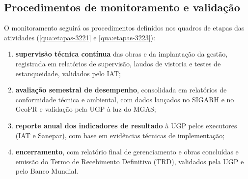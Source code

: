 \subsection{Procedimentos de monitoramento e validação}

O monitoramento seguirá os procedimentos definidos nos quadros de etapas das
atividades (\autoref{qua:etapas-3221} e \autoref{qua:etapas-3223}):

\begin{enumerate}[label=\alph*)]
  \item \textbf{supervisão técnica contínua} das obras e da implantação da
        gestão, registrada em relatórios de supervisão, laudos de vistoria e
        testes de estanqueidade, validados pelo IAT;
  \item \textbf{avaliação semestral de desempenho}, consolidada em relatórios
        de conformidade técnica e ambiental, com dados lançados no SIGARH e no
        GeoPR e validação pela UGP à luz do MGAS;
  \item \textbf{reporte anual dos indicadores de resultado} à UGP pelos
        executores (IAT e Sanepar), com base em evidências técnicas de
        implementação;
  \item \textbf{encerramento}, com relatório final de gerenciamento e obras
        concluídas e emissão do Termo de Recebimento Definitivo (TRD),
        validados pela UGP e pelo Banco Mundial.
\end{enumerate}
